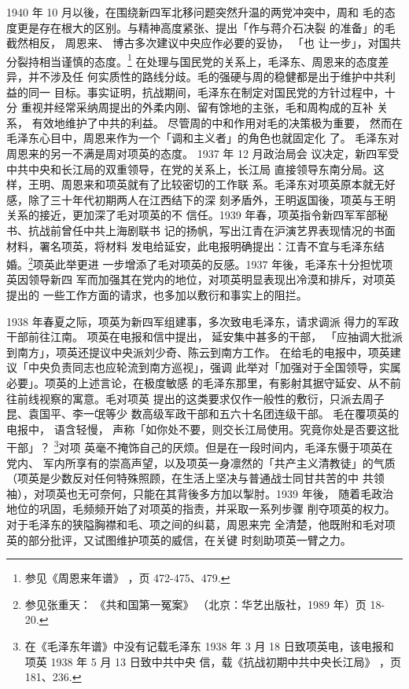 1940 年 10 月以後，在围绕新四军北移问题突然升温的两党冲突中，周和
毛的态度更是存在根大的区别。与精神高度紧张、提出「作与蒋介石决裂
的准备」的毛截然相反，
周恩来、
博古多次建议中央应作必要的妥协，
「也
让一步」，对国共分裂持相当谨慎的态度。\footnote{参见《周恩来年谱》
，页 472-475、479.}
在处理与国民党的关系上，毛泽东、周恩来的态度差异，并不涉及任
何实质性的路线分歧。毛的强硬与周的稳健都是出于维护中共利益的同一
目标。事实证明，抗战期间，毛泽东在制定对国民党的方针过程中，十分
重视并经常采纳周提出的外柔内刚、留有馀地的主张，毛和周构成的互补
关系，
有效地维护了中共的利益。
尽管周的中和作用对毛的决策极为重要，
然而在毛泽东心目中，周恩来作为一个「调和主义者」的角色也就固定化
了。
毛泽东对周恩来的另一不满是周对项英的态度。
1937 年 12 月政治局会
议决定，新四军受中共中央和长江局的双重领导，在党的关系上，长江局
直接领导东南分局。这样，王明、周恩来和项英就有了比较密切的工作联
系。毛泽东对项英原本就无好感，除了三十年代初期两人在江西结下的深
刻矛盾外，王明返国後，项英与王明关系的接近，更加深了毛对项英的不
信任。1939 年春，项英指令新四军军部秘书、抗战前曾任中共上海剧联书
记的扬帆，写出江青在沪演艺界表现情况的书面材料，署名项英，将材料
发电给延安，此电报明确提出：江青不宜与毛泽东结婚。\footnote{参见张重天：
《共和国第一冤案》
（北京：华艺出版社，1989 年）页 18-20.}项英此举更进
一步增添了毛对项英的反感。1937 年後，毛泽东十分担忧项英因领导新四
军而加强其在党内的地位，对项英明显表现出冷漠和排斥，对项英提出的
一些工作方面的请求，也多加以敷衍和事实上的阻拦。

1938 年春夏之际，项英为新四军组建事，多次致电毛泽东，请求调派
得力的军政干部前往江南。
项英在电报和信中提出，
延安集中甚多的干部，
「应抽调大批派到南方」，项英还提议中央派刘少奇、陈云到南方工作。
在给毛的电报中，项英建议「中央负责同志也应轮流到南方巡视」，强调
此举对「加强对于全国领导，实属必要」。项英的上述言论，在极度敏感
的毛泽东那里，有影射其据守延安、从不前往前线视察的寓意。毛对项英
提出的这类要求仅作一般性的敷衍，只派去周子昆、袁国平、李一氓等少
数高级军政干部和五六十名团连级干部。
毛在覆项英的电报中，
语含轻慢，
声称「如你处不要，则交长江局使用。究竟你处是否要这批干部」？
\footnote{在《毛泽东年谱》中没有记载毛泽东 1938 年 3 月 18 日致项英电，该电报和项英 1938 年 5 月 13 日致中共中央
信，载《抗战初期中共中央长江局》
，页 181、236.}对项
英毫不掩饰自己的厌烦。但是在一段时间内，毛泽东慑于项英在党内、
军内所享有的崇高声望，以及项英一身凛然的「共产主义清教徒」的气质
（项英是少数反对任何特殊照顾，在生活上坚决与普通战士同甘共苦的中
共领袖），对项英也无可奈何，只能在其背後多方加以掣肘。1939 年後，
随着毛政治地位的巩固，毛频频开始了对项英的指责，并采取一系列步骤
削夺项英的权力。对于毛泽东的狭隘胸襟和毛、项之间的纠葛，周恩来完
全清楚，他既附和毛对项英的部分批评，又试图维护项英的威信，在关键
时刻助项英一臂之力。

